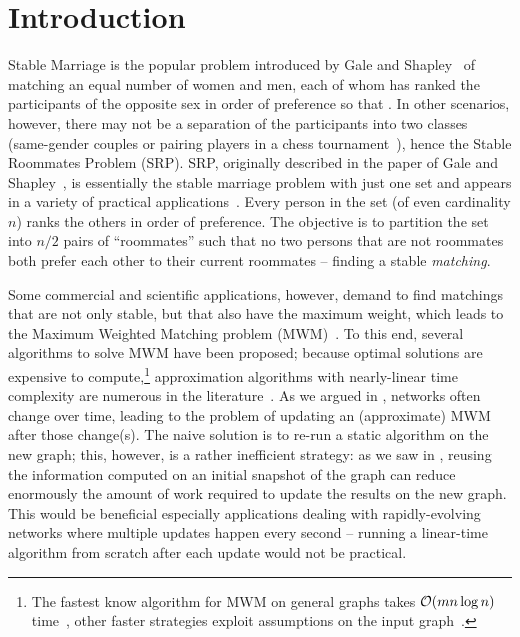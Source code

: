 \chapter*{Introduction}
%
Stable Marriage is the popular problem introduced by Gale and
Shapley~\cite{DBLP:journals/tamm/GaleS13} of matching an equal number of women
and men, each of whom has ranked the participants of the opposite sex in order
of preference so that .
In other scenarios, however, there may not be a separation of the participants
into two classes (\eg same-gender couples or pairing players in a chess
tournament~\cite{kujansuu1999stable}), hence the Stable Roommates Problem
(SRP). SRP, originally described in the paper of Gale and
Shapley~\cite{DBLP:journals/tamm/GaleS13}, is essentially the stable marriage
problem with just one set and appears in a variety of practical
applications~\cite{iwama2007stable}. Every person in the set (of even cardinality $n$)
ranks the others in order of preference. The objective is to partition
the set into $n/2$ pairs of \enquote{roommates} such that no two
persons that are not roommates both prefer each other to their
current roommates -- \ie finding a stable \emph{matching}.

Some commercial and scientific applications, however, demand to find matchings
that are not only stable, but that also have the maximum weight, which leads to
the Maximum Weighted Matching problem
(MWM)~\cite{bisseling2020parallel,DBLP:conf/ecir/LaitangPB13,
DBLP:journals/ijprai/ConteFSV04,
DBLP:journals/pc/MonienPD00,wang2004bipartite,DBLP:conf/ismb/BorgwardtOSVSK05,
DBLP:journals/dc/HalldorssonKPR18,DBLP:journals/jpdc/Patt-ShamirRS12}.
To this end, several algorithms to solve MWM have been proposed;
because optimal solutions are expensive to compute,\footnote{The fastest
know algorithm for MWM on general graphs takes $\mathcal{O}(mn\log n)$
time~\cite{galil1986efficient}, other faster strategies exploit assumptions
on the input graph~\cite{DBLP:journals/talg/DuanPS18}.}
approximation algorithms with nearly-linear time complexity are
numerous in the literature~\cite{DBLP:conf/stacs/Preis99,DBLP:conf/ppam/ManneB07,
DBLP:conf/europar/BirnOSSS13,DBLP:conf/wea/DrakeH03,
DBLP:journals/ipl/DrakeH03,DBLP:conf/wea/MaueS07,DBLP:conf/ipps/ManneH14}.
As we argued in , networks often change
over time, leading to the problem of updating an (approximate) MWM
after those change(s). The naive solution is to re-run a static algorithm
on the new graph; this, however, is a rather inefficient strategy:
as we saw in , reusing the information computed on an
initial snapshot of the graph can reduce enormously the amount of work
required to update the results on the new graph.
This would be beneficial especially  applications dealing with
rapidly-evolving networks where multiple updates happen every second --
running a linear-time algorithm from scratch after each update would not
be practical.

